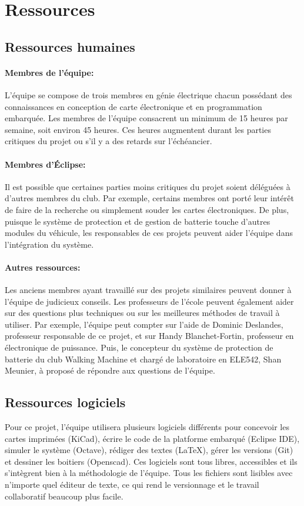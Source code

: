 \section{Ressources}

	\subsection{Ressources humaines}
	
		\paragraph{Membres de l'équipe:}
		L'équipe se compose de trois membres en génie électrique chacun possédant des connaissances en conception de carte électronique et en programmation embarquée. Les membres de l'équipe consacrent un minimum de 15 heures par semaine, soit environ 45 heures. Ces heures augmentent durant les parties critiques du projet ou s'il y a des retards sur l'échéancier.
		
		\paragraph{Membres d'Éclipse:}
		Il est possible que certaines parties moins critiques du projet soient déléguées à d'autres membres du club. Par exemple, certains membres ont porté leur intérêt de faire de la recherche ou simplement souder les cartes électroniques. De plus, puisque le système de protection et de gestion de batterie touche d'autres modules du véhicule, les responsables de ces projets peuvent aider l'équipe dans l'intégration du système.
		
		\paragraph{Autres ressources:}
		Les anciens membres ayant travaillé sur des projets similaires peuvent donner à l'équipe de judicieux conseils. Les professeurs de l'école peuvent également aider sur des questions plus techniques ou sur les meilleures méthodes de travail à utiliser. Par exemple, l'équipe peut compter sur l'aide de Dominic Deslandes, professeur responsable de ce projet, et sur Handy Blanchet-Fortin, professeur en électronique de puissance. Puis, le concepteur du système de protection de batterie du club Walking Machine et chargé de laboratoire en ELE542, Shan Meunier, à proposé de répondre aux questions de l'équipe.
		
	\subsection{Ressources logiciels}
	Pour ce projet, l'équipe utilisera plusieurs logiciels différents pour concevoir les cartes imprimées (KiCad), écrire le code de la platforme embarqué (Eclipse IDE), simuler le système (Octave), rédiger des textes (LaTeX), gérer les versions (Git) et dessiner les boitiers (Openscad). Ces logiciels sont tous libres, accessibles et ils s'intègrent bien à la méthodologie de l'équipe. Tous les fichiers sont lisibles avec n'importe quel éditeur de texte, ce qui rend le versionnage et le travail collaboratif beaucoup plus facile.
	
